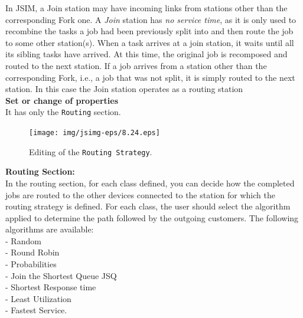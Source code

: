 In JSIM, a Join station may have incoming links from stations
other than the corresponding Fork one. A \emph{Join} station has
\emph{no service time}, as it is only used to recombine the tasks
a job had been previously split into and then route the job to
some other station(s). When a task arrives at a join station, it
waits until all its sibling tasks have arrived. At this time, the
original job is recomposed and routed to the next station. If a
job arrives from a station other than the corresponding Fork,
i.e., a job that was not split, it is simply routed to the next
station. In this
case the Join station operates as a routing station\\

\noindent \textbf{ Set or change of properties}\\ It has only the
\texttt{Routing} section.\\
\begin{figure}[htb]
    \begin{center}
        \texttt{[image: img/jsimg-eps/8.24.eps]}
    \end{center}
    \caption{Editing of the \texttt{Routing Strategy}.}
    \label{fig:edjprop}
\end{figure}

\noindent \textbf{Routing Section:}\\ In the routing section, for each class
defined, you can decide how the completed jobs are routed to the
other devices connected to the station for which the routing
strategy is defined.
For each class, the user should select the algorithm applied to
determine the path followed by the outgoing customers.
The following algorithms are available:\\
- Random\\  - Round Robin\\ - Probabilities\\   - Join the Shortest Queue JSQ\\
- Shortest Response time\\ - Least Utilization\\  - Fastest Service.\\

